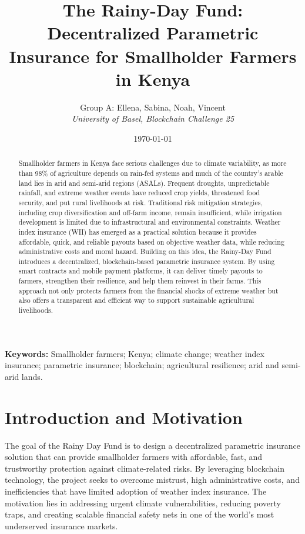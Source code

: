 \documentclass[11pt,a4paper]{article}
\title{\textbf{The Rainy-Day Fund: Decentralized Parametric Insurance for Smallholder Farmers in Kenya}}
\author{
    Group A: Ellena, Sabina, Noah, Vincent\\[0.5em]
    \textit{University of Basel, Blockchain Challenge 25}
}
\date{\today}
\begin{document}
    \maketitle

    \begin{abstract}
        Smallholder farmers in Kenya face serious challenges due to climate variability, as more than 98\% of agriculture depends on rain-fed systems and much of the country’s arable land lies in arid and semi-arid regions (ASALs).
        Frequent droughts, unpredictable rainfall, and extreme weather events have reduced crop yields, threatened food security, and put rural livelihoods at risk.
        Traditional risk mitigation strategies, including crop diversification and off-farm income, remain insufficient, while irrigation development is limited due to infrastructural and environmental constraints.
        Weather index insurance (WII) has emerged as a practical solution because it provides affordable, quick, and reliable payouts based on objective weather data, while reducing administrative costs and moral hazard.
        Building on this idea, the Rainy-Day Fund introduces a decentralized, blockchain-based parametric insurance system.
        By using smart contracts and mobile payment platforms, it can deliver timely payouts to farmers, strengthen their resilience, and help them reinvest in their farms.
        This approach not only protects farmers from the financial shocks of extreme weather but also offers a transparent and efficient way to support sustainable agricultural livelihoods.
    \end{abstract}

    \noindent\textbf{Keywords:} Smallholder farmers; Kenya; climate change; weather index insurance; parametric insurance; blockchain; agricultural resilience; arid and semi-arid lands.

    \tableofcontents
    \bigskip

    \section{Introduction and Motivation}\label{sec:intro}
    The goal of the Rainy Day Fund is to design a decentralized parametric insurance solution that can provide smallholder farmers with affordable, fast, and trustworthy protection against climate-related risks.
    By leveraging blockchain technology, the project seeks to overcome mistrust, high administrative costs, and inefficiencies that have limited adoption of weather index insurance.
    The motivation lies in addressing urgent climate vulnerabilities, reducing poverty traps, and creating scalable financial safety nets in one of the world’s most underserved insurance markets.
\end{document}
